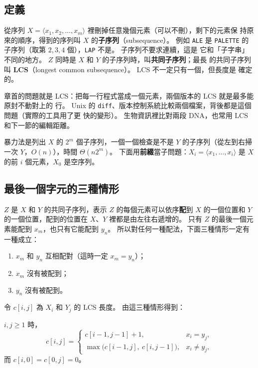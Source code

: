 \subsection{定義}

從序列 $X = \langle x_1, x_2, \ldots, x_m \rangle$ 裡刪掉任意幾個元素（可以不刪），剩下的元素保
持原來的順序，得到的序列叫 $X$ 的\textbf{子序列}（subsequence）。 例如 \texttt{ALE} 是
\texttt{PALETTE} 的子序列（取第 $2, 3, 4$ 個），\texttt{LAP} 不是。 子序列不要求連續，這是
它和「子字串」不同的地方。 $Z$ 同時是 $X$ 和 $Y$ 的子序列時，叫\textbf{共同子序列}；最長
的共同子序列叫 \textbf{LCS}（longest common subsequence）。 LCS 不一定只有一個，但長度是
確定的。

章首的問題就是 LCS：把每一行程式當成一個元素，兩個版本的 LCS 就是最多能原封不動對上的
行。 Unix 的 \texttt{diff}、版本控制系統比較兩個檔案，背後都是這個問題（實際的工具用了更
快的變形）。 生物資訊裡比對兩段 DNA，也常用 LCS 和下一節的編輯距離。

暴力法是列出 $X$ 的 $2^m$ 個子序列，一個一個檢查是不是 $Y$ 的子序列（從左到右掃一次
$Y$，$O(n)$），時間 $\Theta(n 2^m)$。 下面用\textbf{前綴}當子問題：$X_i = \langle x_1,
\ldots, x_i \rangle$ 是 $X$ 的前 $i$ 個元素，$X_0$ 是空序列。

\subsection{最後一個字元的三種情形}

$Z$ 是 $X$ 和 $Y$ 的共同子序列，表示 $Z$ 的每個元素可以依序\textbf{配}到 $X$ 的一個位置和
$Y$ 的一個位置，配到的位置在 $X$、$Y$ 裡都是由左往右遞增的。 只有 $Z$ 的最後一個元素能配到
$x_m$，也只有它能配到 $y_n$。 所以對任何一種配法，下面三種情形一定有一種成立：

\begin{enumerate}
\item $x_m$ 和 $y_n$ 互相配對（這時一定 $x_m = y_n$）；
\item $x_m$ 沒有被配到；
\item $y_n$ 沒有被配到。
\end{enumerate}

令 $c[i, j]$ 為 $X_i$ 和 $Y_j$ 的 LCS 長度。 由這三種情形得到：

\begin{theorem}
\label{thm:dp-lcs}
$i, j \ge 1$ 時，
\[
c[i, j] = \begin{cases}
c[i - 1, j - 1] + 1, & x_i = y_j, \\
\max\bigl(c[i - 1, j],\ c[i, j - 1]\bigr), & x_i \ne y_j,
\end{cases}
\]
而 $c[i, 0] = c[0, j] = 0$。
\end{theorem}


